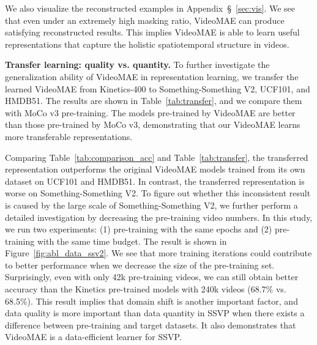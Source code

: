 \documentclass{article}
\begin{document}
We also visualize the reconstructed examples in Appendix~\S~\ref{sec:vis}. We see that even under an extremely high masking ratio, VideoMAE can produce satisfying reconstructed results. This implies VideoMAE is able to learn useful representations that capture the holistic spatiotemporal structure in videos.

{\flushleft \bf Transfer learning: quality vs. quantity.} To further investigate the generalization ability of VideoMAE in representation learning, we transfer the learned VideoMAE from Kinetics-400 to Something-Something V2, UCF101, and HMDB51. The results are shown in Table~\ref{tab:transfer}, and we compare them with MoCo v3 pre-training. The models pre-trained by VideoMAE are better than those pre-trained by MoCo v3, demonstrating that our VideoMAE learns more transferable representations.



Comparing Table~\ref{tab:comparison_acc} and Table~\ref{tab:transfer}, the transferred representation outperforms the original VideoMAE models trained from its own dataset on UCF101 and HMDB51. In contrast, the transferred representation is worse on Something-Something V2. To figure out whether this inconsistent result is caused by the large scale of Something-Something V2, we further perform a detailed investigation by decreasing the pre-training video numbers. In this study, we run two experiments: (1) pre-training with the same epochs and (2) pre-training with the same time budget. The result is shown in Figure~\ref{fig:abl_data_ssv2}. We see that more training iterations could contribute to better performance when we decrease the size of the pre-training set. Surprisingly, even with only 42k pre-training videos, we can still obtain better accuracy than the Kinetics pre-trained models with 240k videos (68.7\% vs. 68.5\%). This result implies that domain shift is another important factor, and data quality is more important than data quantity in SSVP when there exists a difference between pre-training and target datasets. It also demonstrates that VideoMAE is a data-efficient learner for SSVP.
\end{document}
